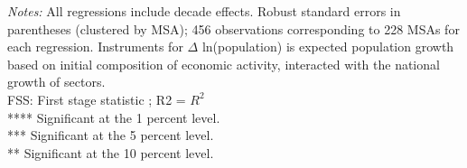 \begin{table}[htbp]
\begin{flushleft}
\emph{Notes:} All regressions include decade effects. Robust standard errors in parentheses (clustered by MSA); 456 observations corresponding to 228 MSAs for each regression. Instruments for $\Delta$ ln(population) is expected population growth based on initial composition of economic activity, interacted with the national growth of sectors. \\ FSS: First stage statistic ; R2 = $ R^{2} $ \\         **** Significant at the 1 percent level. \\         *** Significant at the 5 percent level. \\         ** Significant at the 10 percent level.
\end{flushleft}
\end{table}
